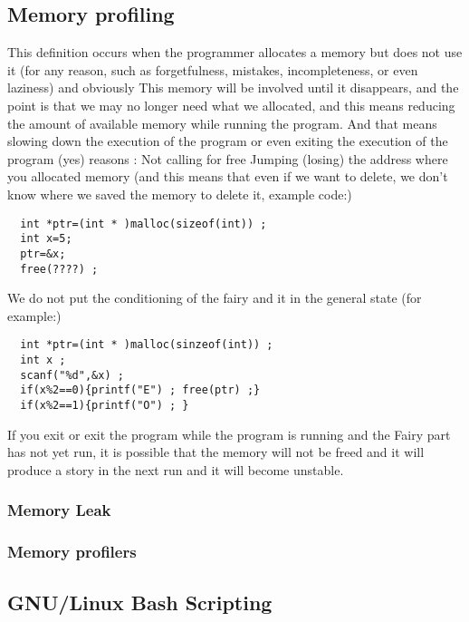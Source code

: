 \documentclass[12pt]{article}
\begin{document}
\subsection{Memory profiling}
This definition occurs when the programmer allocates a memory but does not use it (for any reason, such as forgetfulness, mistakes, incompleteness, or even laziness) and obviously
This memory will be involved until it disappears, and the point is that we may no longer need what we allocated, and this means reducing the amount of available memory while running the program.
And that means slowing down the execution of the program or even exiting the execution of the program (yes)
\newline reasons :
Not calling for free
\newline
Jumping (losing) the address where you allocated memory (and this means that even if we want to delete, we don't know where we saved the memory to delete it, example code:)\newline
\begin{lstlisting}
  int *ptr=(int * )malloc(sizeof(int)) ;
  int x=5;
  ptr=&x;
  free(????) ;
  \end{lstlisting}
  \newline


We do not put the conditioning of the fairy and it in the general state (for example:)\newline
\begin{lstlisting}
  int *ptr=(int * )malloc(sinzeof(int)) ;
  int x ;
  scanf("%d",&x) ;
  if(x%2==0){printf("E") ; free(ptr) ;}
  if(x%2==1){printf("O") ; }
  \end{lstlisting}
  \newline


If you exit or exit the program while the program is running and the Fairy part has not yet run, it is possible that the memory will not be freed and it will produce a story in the next run and it will become unstable.
\newline

\subsubsection{Memory Leak}


\subsubsection{Memory profilers}


\subsection{GNU/Linux Bash Scripting}
\end{document}
